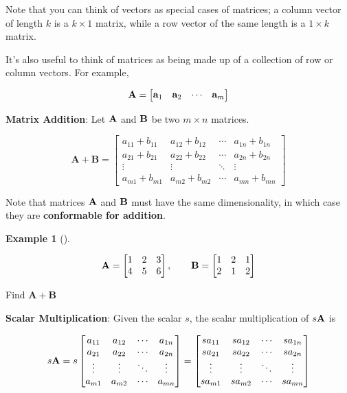 \documentclass[
  letterpaper,
]{book}
\theoremstyle{definition}
\theoremstyle{definition}
\newtheorem{example}{Example}[chapter]
\theoremstyle{plain}
\theoremstyle{definition}
\theoremstyle{plain}
\theoremstyle{plain}
\theoremstyle{remark}
\begin{document}
Note that you can think of vectors as special cases of matrices; a
column vector of length \(k\) is a \(k \times 1\) matrix, while a row
vector of the same length is a \(1 \times k\) matrix.

It's also useful to think of matrices as being made up of a collection
of row or column vectors. For example,

\[\bf A = \begin{bmatrix} {\bf a}_1 & {\bf a}_2 &  \cdots & {\bf a}_m \end{bmatrix}\]

\textbf{Matrix Addition}: Let \(\bf A\) and \(\bf B\) be two
\(m\times n\) matrices.

\[\mathbf{A+B}=\begin{bmatrix} a_{11}+b_{11} & a_{12}+b_{12} & \cdots & a_{1n}+b_{1n} \\ a_{21}+b_{21} & a_{22}+b_{22} & \cdots & a_{2n}+b_{2n} \\ \vdots & \vdots  & \ddots & \vdots \\ a_{m1}+b_{m1} & a_{m2}+b_{m2} & \cdots & a_{mn}+b_{mn} \end{bmatrix}\]

Note that matrices \({\bf A}\) and \({\bf B}\) must have the same
dimensionality, in which case they are \textbf{conformable for
addition}.

\leavevmode{}%
\begin{example}[]\label{exm-matrixaddition}

\[{\bf A}=\begin{bmatrix} 1 & 2 & 3 \\ 4 & 5 & 6 \end{bmatrix}, \qquad {\bf B}=\begin{bmatrix} 1 & 2 & 1 \\ 2 & 1 & 2 \end{bmatrix}\]

Find \(\mathbf{A}+\mathbf{B}\)

\end{example}

\textbf{Scalar Multiplication}: Given the scalar \(s\), the scalar
multiplication of \(s {\bf A}\) is

\[ s {\bf A}=  s \begin{bmatrix} a_{11} & a_{12} & \cdots & a_{1n} \\ a_{21} & a_{22} & \cdots & a_{2n} \\ \vdots & \vdots & \ddots & \vdots \\ a_{m1} & a_{m2} & \cdots & a_{mn} \end{bmatrix} = \begin{bmatrix} s a_{11} & s a_{12} & \cdots & s a_{1n} \\ s a_{21} & s a_{22} & \cdots & s a_{2n} \\ \vdots & \vdots & \ddots & \vdots \\ s a_{m1} & s a_{m2} & \cdots & s a_{mn} \end{bmatrix}\]
\end{document}
